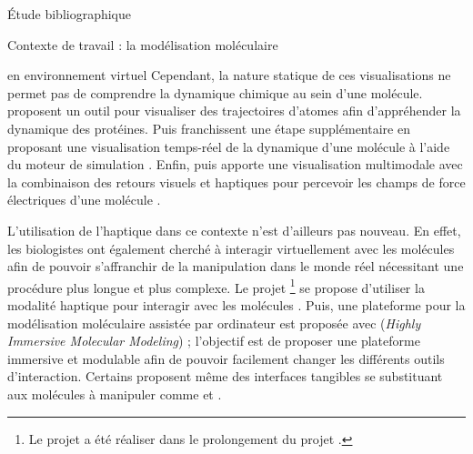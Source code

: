 \documentclass[myfrancais,ngerman,english,french]{mythesis}
\begin{document}
\begin{mychapter}{Étude bibliographique}
\begin{mysection}{Contexte de travail : la modélisation moléculaire}
\begin{mysubsection}{ en environnement virtuel}
				Cependant, la nature statique de ces visualisations ne permet pas de comprendre la dynamique chimique au sein d'une molécule.
				 proposent un outil pour visualiser des trajectoires d'atomes afin d'appréhender la dynamique des protéines.
				Puis  franchissent une étape supplémentaire en proposant une visualisation temps-réel de la dynamique d'une molécule à l'aide du moteur de simulation \myGromacs {}.
				Enfin,  puis  apporte une visualisation multimodale avec la combinaison des retours visuels et haptiques pour percevoir les champs de force électriques d'une molécule .

				\begin{myfigure}
				\end{myfigure}

				L'utilisation de l'haptique dans ce contexte n'est d'ailleurs pas nouveau.
				En effet, les biologistes ont également cherché à interagir virtuellement avec les molécules afin de pouvoir s'affranchir de la manipulation dans le monde réel nécessitant une procédure plus longue et plus complexe.
				Le projet \myGROPEHaptic\footnote{Le projet \myGROPEHaptic a été réaliser dans le prolongement du projet \myGROPE.} se propose d'utiliser la modalité haptique pour interagir avec les molécules .
				Puis, une plateforme pour la modélisation moléculaire assistée par ordinateur est proposée avec \myHIMM (\textit{Highly Immersive Molecular Modeling}) ; l'objectif est de proposer une plateforme immersive et modulable afin de pouvoir facilement changer les différents outils d'interaction.
				Certains proposent même des interfaces tangibles se substituant aux molécules à manipuler comme  et .


\end{mysubsection}
\end{mysection}
\end{mychapter}
\end{document}
